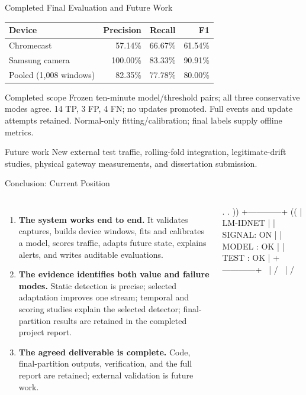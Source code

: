 \documentclass[aspectratio=169,10pt]{beamer}
\begin{document}
\begin{frame}{Completed Final Evaluation and Future Work}
\small
\begin{tabular}{lrrr}
\toprule
\textbf{Device} & \textbf{Precision} & \textbf{Recall} & \textbf{F1}\\
\midrule
Chromecast & 57.14\% & 66.67\% & 61.54\%\\
Samsung camera & 100.00\% & 83.33\% & 90.91\%\\
Pooled (1,008 windows) & 82.35\% & 77.78\% & 80.00\%\\
\bottomrule
\end{tabular}
\begin{block}{Completed scope}
Frozen ten-minute model/threshold pairs; all three conservative modes agree.
14 TP, 3 FP, 4 FN; no updates promoted. Full events and update attempts retained.
Normal-only fitting/calibration; final labels supply offline metrics.
\end{block}
\begin{exampleblock}{Future work}
New external test traffic, rolling-fold integration, legitimate-drift studies,
physical gateway measurements, and dissertation submission.
\end{exampleblock}
\end{frame}

\begin{frame}[fragile]{Conclusion: Current Position}
\begin{columns}[T,onlytextwidth]
\begin{enumerate}
  \item \textbf{The system works end to end.} It validates captures, builds
  device windows, fits and calibrates a model, scores traffic, adapts future
  state, explains alerts, and writes auditable evaluations.
  \item \textbf{The evidence identifies both value and failure modes.} Static
  detection is precise; selected adaptation improves one stream; temporal and
  scoring studies explain the selected detector; final-partition results are
  retained in the completed project report.
  \item \textbf{The agreed deliverable is complete.} Code, final-partition outputs,
  verification, and the full report are retained; external validation is future work.
\end{enumerate}

\begin{asciiart}
       .      .
  ))  +------------+  ((
      |  LM-IDNET  |
      | SIGNAL: ON |
      | MODEL : OK |
      | TEST  : OK |
      +------------+
         \  |  /
          \ | /
\end{asciiart}
\end{columns}

\end{frame}
\end{document}
